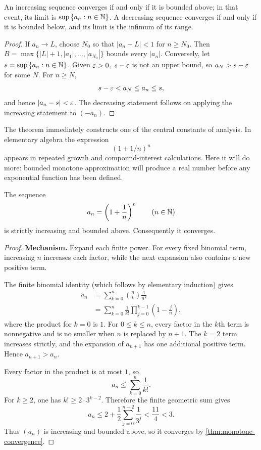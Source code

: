 \begin{theorem}
\label{thm:monotone-convergence}
An increasing sequence converges if and only if it is bounded above; in that event, its limit is $\sup\left\{a_n:n\in\mathbb{N}\right\}$. A decreasing sequence converges if and only if it is bounded below, and its limit is the infimum of its range.
\end{theorem}
\begin{proof}
If $a_n\to L$, choose $N_0$ so that $|a_n-L|<1$ for $n\geq N_0$.
Then $B=\max\{|L|+1,|a_1|,\ldots,|a_{N_0}|\}$ bounds every $|a_n|$. Conversely, let $s=\sup\left\{a_n:n\in\mathbb{N}\right\}$. Given $\varepsilon>0$, $s-\varepsilon$ is not an upper bound, so $a_N>s-\varepsilon$ for some $N$. For $n\geq N$,
\[
s-\varepsilon<a_N\leq a_n\leq s,
\]
 and hence $\lvert a_n-s\rvert<\varepsilon$. The decreasing statement follows on applying the increasing statement to $(-a_n)$.
\end{proof}

The theorem immediately constructs one of the central constants of analysis.
In elementary algebra the expression
\[
(1+1/n)^n
\]
 appears in repeated
growth and compound-interest calculations. Here it will do more: bounded
monotone approximation will produce a real number before any exponential
function has been defined.

\begin{theorem}
\label{thm:e-sequence}
The sequence
\[
a_n=\left(1+\frac1n\right)^n
\qquad(n\in\mathbb{N})
\]
is strictly increasing and bounded above. Consequently it converges.
\end{theorem}
\begin{proof}
\textbf{Mechanism.} Expand each finite power. For every fixed binomial
term, increasing \(n\) increases each factor, while the next expansion also
contains a new positive term.

The finite binomial identity (which follows by elementary induction) gives
\[
\begin{aligned}
a_n
&=\sum_{k=0}^{n}\binom nk\frac1{n^k}\\
&=\sum_{k=0}^{n}\frac1{k!}
  \prod_{j=0}^{k-1}\left(1-\frac jn\right),
\end{aligned}
\]
where the product for \(k=0\) is \(1\). For \(0\leq k\leq n\), every
factor in the \(k\)th term is nonnegative and is no smaller when \(n\) is
replaced by \(n+1\). The \(k=2\) term increases strictly, and the expansion
of \(a_{n+1}\) has one additional positive term. Hence \(a_{n+1}>a_n\).

Every factor in the product is at most \(1\), so
\[
a_n\leq\sum_{k=0}^{n}\frac1{k!}.
\]
For \(k\geq2\), one has \(k!\geq2\cdot3^{k-2}\). Therefore the finite
geometric sum gives
\[
a_n\leq2+\frac12\sum_{j=0}^{n-2}\frac1{3^j}<\frac{11}{4}<3.
\]
Thus \((a_n)\) is increasing and bounded above, so it converges by
\cref{thm:monotone-convergence}.
\end{proof}

